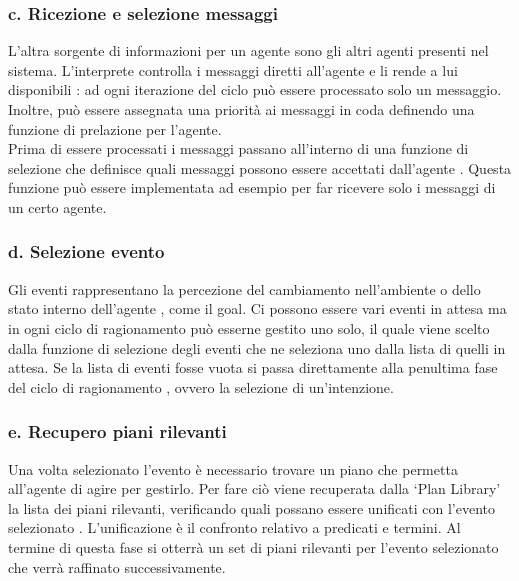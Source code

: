 \subsubsection{c. Ricezione e selezione messaggi}
L'altra sorgente di informazioni per un agente sono gli altri agenti presenti nel sistema. L'interprete controlla i messaggi diretti all'agente e li rende a lui disponibili \cite{JasonAgentSpeak}: ad ogni iterazione del ciclo può essere processato solo un messaggio. Inoltre, può essere assegnata una priorità ai messaggi in coda definendo una funzione di prelazione per l'agente.
\\
Prima di essere processati i messaggi passano all'interno di una funzione di selezione che definisce quali messaggi possono essere accettati dall'agente \cite{JasonAgentSpeak}. Questa funzione può essere implementata ad esempio per far ricevere solo i messaggi di un certo agente.

\subsubsection{d. Selezione evento}
Gli eventi rappresentano la percezione del cambiamento nell'ambiente o dello stato interno dell'agente \cite{JasonAgentSpeak}, come il goal. Ci possono essere vari eventi in attesa ma in ogni ciclo di ragionamento può esserne gestito uno solo, il quale viene scelto dalla funzione di selezione degli eventi che ne seleziona uno dalla lista di quelli in attesa. Se la lista di eventi fosse vuota si passa direttamente alla penultima fase del ciclo di ragionamento \cite{JasonAgentSpeak}, ovvero la selezione di un'intenzione.

\subsubsection{e. Recupero piani rilevanti}
Una volta selezionato l'evento è necessario trovare un piano che permetta all'agente di agire per gestirlo. Per fare ciò viene recuperata dalla `Plan Library' la lista dei piani rilevanti, verificando quali possano essere unificati con l'evento selezionato \cite{JasonAgentSpeak}. L'unificazione è il confronto relativo a predicati e termini. Al termine di questa fase si otterrà un set di piani rilevanti per l'evento selezionato che verrà raffinato successivamente.

